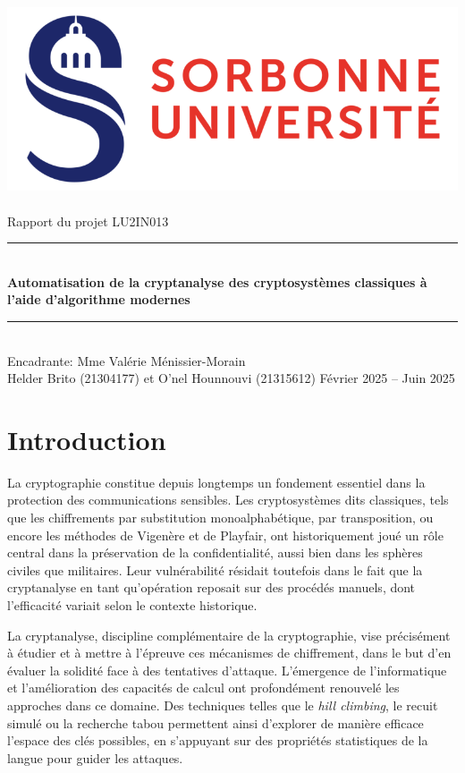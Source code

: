 \documentclass[a4paper]{article}
\begin{document}
\thispagestyle{plain} 
\begin{titlepage} 
    \begin{center} 
        \bigskip 
        \includegraphics[scale=0.5]{logo_su.jpg}~\\[4cm] 
        {\LARGE Rapport du projet LU2IN013}\\[0.3cm] 
        \rule{\linewidth}{0.5mm} \\[0.6cm] 
        {\huge \textbf{Automatisation de la cryptanalyse des cryptosystèmes classiques à l'aide d'algorithme modernes}}\\[0.4cm] 
        \rule{\linewidth}{0.5mm} \\[1cm] {\large Encadrante: Mme Valérie Ménissier-Morain}\\[4cm] 
        {\Large Helder Brito (21304177) et O'nel Hounnouvi (21315612) }
        \vfill Février 2025 -- Juin 2025
    \end{center} 
\end{titlepage}

\newpage

\tableofcontents

\newpage

\section{Introduction}
La cryptographie constitue depuis longtemps un fondement essentiel dans la protection des communications sensibles. Les cryptosystèmes dits classiques, tels que les chiffrements par substitution monoalphabétique, par transposition, ou encore les méthodes de Vigenère et de Playfair, ont historiquement joué un rôle central dans la préservation de la confidentialité, aussi bien dans les sphères civiles que militaires. Leur vulnérabilité résidait toutefois dans le fait que la cryptanalyse en tant qu'opération reposait sur des procédés manuels, dont l’efficacité variait selon le contexte historique.

La cryptanalyse, discipline complémentaire de la cryptographie, vise précisément à étudier et à mettre à l’épreuve ces mécanismes de chiffrement, dans le but d’en évaluer la solidité face à des tentatives d’attaque. L’émergence de l’informatique et l’amélioration des capacités de calcul ont profondément renouvelé les approches dans ce domaine. Des techniques telles que le \textit{hill climbing}, le recuit simulé ou la recherche tabou permettent ainsi d’explorer de manière efficace l’espace des clés possibles, en s’appuyant sur des propriétés statistiques de la langue pour guider les attaques.
\end{document}
